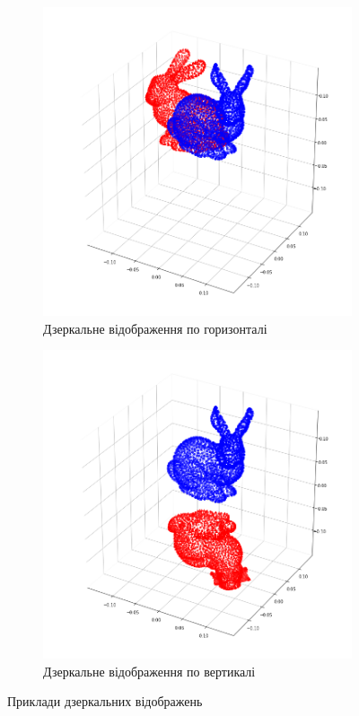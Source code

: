 \begin{figure}[h]
  \centering
  \begin{subfigure}[b]{0.45\textwidth}
      \includegraphics[width=\textwidth]{images/mirror_reflection_h}
      \caption{Дзеркальне відображення по горизонталі}
  \end{subfigure}
  \begin{subfigure}[b]{0.45\textwidth}
      \includegraphics[width=\textwidth]{images/mirror_reflection_v}
      \caption{Дзеркальне відображення по вертикалі}
  \end{subfigure}
  \caption{Приклади дзеркальних відображень}
  \label{fig:mirror:reflection}
\end{figure}

